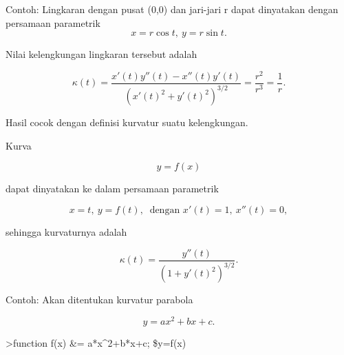 \documentclass[
]{book}
\begin{document}
Contoh: Lingkaran dengan pusat (0,0) dan jari-jari r dapat dinyatakan dengan persamaan parametrik \[x=r\cos t,\ y=r\sin t.\]

Nilai kelengkungan lingkaran tersebut adalah

\[\kappa(t)=\frac{x'(t)y''(t)-x''(t)y'(t)}{\left(x'(t)^2+y'(t)^2\right)^{3/2}}=\frac{r^2}{r^3}=\frac 1 r.\]

Hasil cocok dengan definisi kurvatur suatu kelengkungan.

Kurva

\[y=f(x)\]

dapat dinyatakan ke dalam persamaan parametrik

\[x=t,\ y=f(t),\ \text{ dengan } x'(t)=1,\ x''(t)=0,\]

sehingga kurvaturnya adalah

\[\kappa(t) = \frac{y''(t)}{\left(1+y'(t)^2\right)^{3/2}}.\]

Contoh: Akan ditentukan kurvatur parabola

\[y=ax^2+bx+c.\]

\textgreater function f(x) \&= a*x\^{}2+b*x+c; \$y=f(x)
\end{document}
